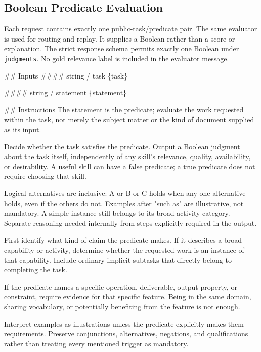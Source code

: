 \subsection{Boolean Predicate Evaluation}
\label{app:prompt-evaluator}
Each request contains exactly one public-task/predicate pair. The same evaluator is used for routing and replay. It supplies a Boolean rather than a score or explanation. The strict response schema permits exactly one Boolean under \texttt{judgments}. No gold relevance label is included in the evaluator message.

\begingroup
\small\ttfamily\raggedright
\#\# Inputs \#\#\#\# string / task \{task\}
\par\smallskip
\#\#\#\# string / statement \{statement\}
\par\smallskip
\#\# Instructions The statement is the predicate; evaluate the work requested within the task, not merely the subject matter or the kind of document supplied as its input.
\par\smallskip
Decide whether the task satisfies the predicate. Output a Boolean judgment about the task itself, independently of any skill’s relevance, quality, availability, or desirability. A useful skill can have a false predicate; a true predicate does not require choosing that skill.
\par\smallskip
Logical alternatives are inclusive: A or B or C holds when any one alternative holds, even if the others do not. Examples after "such as" are illustrative, not mandatory. A simple instance still belongs to its broad activity category. Separate reasoning needed internally from steps explicitly required in the output.
\par\smallskip
First identify what kind of claim the predicate makes. If it describes a broad capability or activity, determine whether the requested work is an instance of that capability.  Include ordinary implicit subtasks that directly belong to completing the task.
\par\smallskip
If the predicate names a specific operation, deliverable, output property, or constraint, require evidence for that specific feature. Being in the same domain, sharing vocabulary, or potentially benefiting from the feature is not enough.
\par\smallskip
Interpret examples as illustrations unless the predicate explicitly makes them requirements. Preserve conjunctions, alternatives, negations, and qualifications rather than treating every mentioned trigger as mandatory.
\par\smallskip

